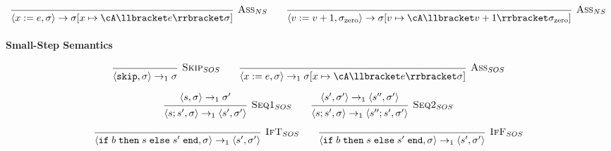 \[
    \begin{prooftree}
        \infer0[\textsc{Ass}$_{NS}$]{\langle x := e, \sigma \rangle \rightarrow \sigma[x \mapsto \cA\llbracket e \rrbracket \sigma]}
    \end{prooftree}
    \qquad
    \begin{prooftree}
        \infer0[\textsc{Ass}$_{NS}$]{\langle v := v + 1, \sigma_\text{zero} \rangle \rightarrow \sigma[v \mapsto \cA\llbracket v + 1 \rrbracket \sigma_\text{zero}]}
    \end{prooftree}
\]

\paragraph{Small-Step Semantics}
\[
    \begin{prooftree}
        \infer0[\textsc{Skip}$_{SOS}$]{\langle \texttt{skip}, \sigma \rangle \rightarrow_1 \sigma}
    \end{prooftree}
    \qquad
    \begin{prooftree}
        \infer0[\textsc{Ass}$_{SOS}$]{\langle x := e, \sigma \rangle \rightarrow_1 \sigma[x \mapsto \cA\llbracket e \rrbracket \sigma ]}
    \end{prooftree}
\]

\[
    \begin{prooftree}
        \hypo{\langle s, \sigma \rangle \rightarrow_1 \sigma'}
        \infer1[\textsc{Seq1}$_{SOS}$]{\langle s;s', \sigma \rangle \rightarrow_1 \langle s', \sigma' \rangle}
    \end{prooftree}
    \qquad
    \begin{prooftree}
        \hypo{\langle s', \sigma' \rangle \rightarrow_1 \langle s'', \sigma' \rangle}
        \infer1[\textsc{Seq2}$_{SOS}$]{\langle s;s', \sigma \rangle \rightarrow_1 \langle s'';s', \sigma' \rangle}
    \end{prooftree}
\]

\[
    \begin{prooftree}
        \infer0[\textsc{IfT}$_{SOS}$]{\langle \texttt{if}\; b \; \texttt{then} \; s \; \texttt{else} \; s' \; \texttt{end}, \sigma \rangle \rightarrow_1 \langle s', \sigma' \rangle}
    \end{prooftree}
    \qquad
    \begin{prooftree}
        \infer0[\textsc{IfF}$_{SOS}$]{\langle \texttt{if}\; b \; \texttt{then} \; s \; \texttt{else} \; s' \; \texttt{end}, \sigma \rangle \rightarrow_1 \langle s', \sigma' \rangle}
    \end{prooftree}
\]

